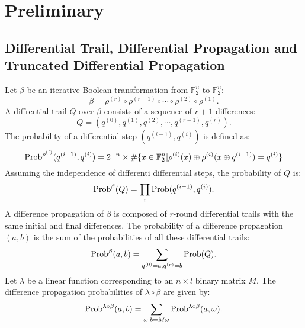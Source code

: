 \section{Preliminary\label{sec:pre}}


\subsection{Differential Trail, Differential Propagation and Truncated Differential Propagation}

Let $\beta$ be an iterative Boolean transformation from $\mathbb{F}_2^n$ to $\mathbb{F}_2^n$: 
\[
    \beta=\rho^{(r)}\circ\rho^{(r-1)}\circ\cdots\circ\rho^{(2)}\circ\rho^{(1)}.
\]
A diffrential trail $Q$ over $\beta$ consists of a sequence of $r+1$ differences:
\[
    Q=(q^{(0)},q^{(1)},q^{(2)},\cdots,q^{(r-1)},q^{(r)}).
\]
The probability of a differential step $(q^{(i-1)},q^{(i)})$ is defined as:
\[
    \text{Prob}^{\rho^{(i)}}(q^{(i-1)},q^{(i)})=2^{-n}\times\#\{x\in \mathbb{F}_2^n|\rho^{(i)}(x)\oplus\rho^{(i)}(x\oplus q^{(i-1)})=q^{(i)}\}
\]
Assuming the independence of differenti differential steps, the probability of $Q$ is:
\[
    \text{Prob}^{\beta}(Q)=\prod\limits_i\text{Prob}(q^{(i-1)},q^{(i)}).
\]
A difference propagation of $\beta$ is composed of $r$-round differential trails with the same initial and final differences. The probability of a difference propagation $(a,b)$ is the sum of the probabilities of all these differential trails:
\[
    \text{Prob}^{\beta}(a,b)=\sum\limits_{q^{(0)}=a,q^{(r)}=b}\text{Prob}(Q).
\]
Let $\lambda$ be a linear function corresponding to an $n\times l$ binary matrix $M$. The difference propagation probabilities of $\lambda\circ\beta$ are given by:
\[
    \text{Prob}^{\lambda\circ\beta}(a,b)=\sum\limits_{\omega|b=M\omega}\text{Prob}^{\lambda\circ\beta}(a,\omega).
\]

